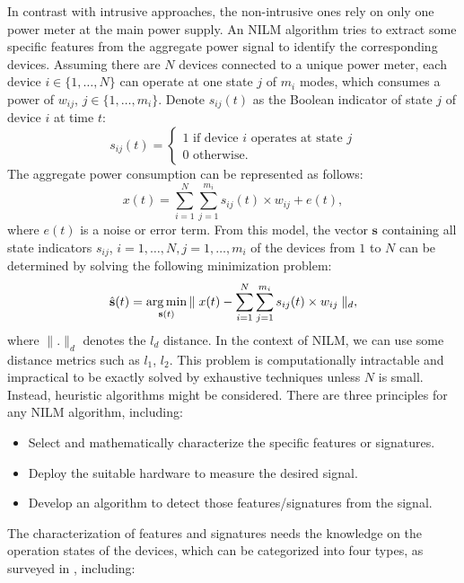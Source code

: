 In contrast with intrusive approaches, the non-intrusive ones rely on only one power meter at the main power supply. An NILM algorithm tries to extract some specific features from the aggregate power signal to identify the corresponding devices.
Assuming there are $N$ devices connected to a unique power meter, each device $i\in \{1,\ldots, N\}$ can operate at one state $j$ of $m_i$ modes, which consumes a power of $w_{ij}$, $j \in \{1,\ldots,m_i\}$. Denote $s_{ij}(t)$ as the Boolean indicator of state $j$ of device $i$ at time $t$:
\begin{equation*}
s_{ij}(t)=\begin{cases}
1 \mbox{ if device $i$ operates at state $j$}\\
0 \mbox{ otherwise}.
\end{cases}
\end{equation*}
The aggregate power consumption can be represented as follows:
\begin{equation}\label{eqI6}
x(t)=\sum_{i=1}^{N}{\sum_{j=1}^{m_i}{s_{ij}(t)\times w_{ij} + e(t)}},
\end{equation}
where $e(t)$ is a noise or error term. From this model, the vector $\mathbf{s}$ containing all state indicators $s_{ij}$, $i=1,\ldots,N, j=1,\ldots,m_i$ of the devices from $1$ to $N$ can be determined by solving the following minimization problem:
\begin{equation}\label{eqI7}
\hat{\mathbf{s}}(t)=\argmin_{\mathbf{s}(t)}{\parallel x(t) - \sum_{i=1}^{N}{\sum_{j=1}^{m_i}{s_{ij}(t)\times w_{ij}}} \parallel_d},
\end{equation}
where $\parallel.\parallel_d$ denotes the $l_d$ distance. In the context of NILM, we can use some distance metrics such as $l_1$, $l_2$.
This problem is computationally intractable and impractical to be exactly solved by exhaustive techniques unless $N$ is small. Instead, heuristic algorithms might be considered. There are three principles for any NILM algorithm, including:
\begin{itemize}
\item Select and mathematically characterize the specific features or signatures.
\item Deploy the suitable hardware  to measure the desired signal.
\item Develop an algorithm to detect those features/signatures from the signal.
\end{itemize}
The characterization of features and signatures needs the knowledge on the operation states of the devices, which can be categorized into four types, as surveyed in \cite{Zoha12}, including:
